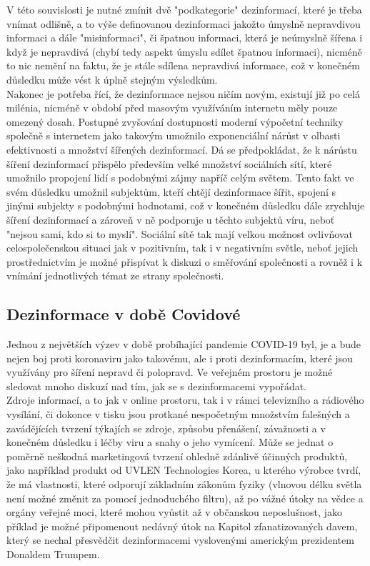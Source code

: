 V této souvislosti je nutné zmínit dvě "podkategorie" dezinformací, které je třeba vnímat odlišně, a to výše definovanou dezinformaci jakožto úmyslně nepravdivou informaci a dále "misinformaci", či špatnou informaci, která je neúmyslně šířena i když je nepravdivá (chybí tedy aspekt úmyslu sdílet špatnou informaci), nicméně to nic nemění na faktu, že je stále sdílena nepravdivá informace, což v konečném důsledku může vést k úplně stejným výsledkům\cite{lam_library_nodate}.\\

Nakonec je potřeba řící, že dezinformace nejsou ničím novým, existují již po celá milénia, nicméně v období před masovým využíváním internetu měly pouze omezený dosah. Postupné zvyšování dostupnosti moderní výpočetní techniky společně s internetem jako takovým umožnilo exponenciální nárůst v olbasti efektivnosti a množství šířených dezinformací. Dá se předpokládat, že k nárůstu šíření dezinformací přispělo především velké množství sociálních sítí, které umožnilo propojení lidí s podobnými zájmy napříč celým světem. Tento fakt ve svém důsledku umožnil subjektům, kteří chtějí dezinformace šířit, spojení s jinými subjekty s podobnými hodnotami, což v konečném důsledku dále zrychluje šíření dezinformací a zároveň v ně podporuje u těchto subjektů víru, neboť "nejsou sami, kdo si to myslí". Sociální sítě tak mají velkou možnost ovlivňovat celospolečenskou situaci jak v pozitivním, tak i v negativním světle, neboť jejich prostřednictvím je možné přispívat k diskuzi o směřování společnosti a rovněž i k vnímání jednotlivých témat ze strany společnosti.

\subsection{Dezinformace v době Covidové}

Jednou z největších výzev v době probíhající pandemie COVID-19 byl, je a bude nejen boj proti koronaviru jako takovému, ale i proti dezinformacím, které jsou využívány pro šíření nepravd či polopravd. Ve veřejném prostoru je možné sledovat mnoho diskuzí nad tím, jak se s dezinformacemi vypořádat.\\

Zdroje informací, a to jak v online prostoru, tak i v rámci televizního a rádiového vysílání, či dokonce v tisku jsou protkané nespočetným množstvím falešných a zavádějících tvrzení týkajích se zdroje, způsobu přenášení, závažnosti a v konečném důsledku i léčby viru a snahy o jeho vymícení. Může se jednat o poměrně neškodná marketingová tvrzení ohledně zdánlivě účinných produktů, jako například produkt od UVLEN \textregistered Technologies Korea\cite{uvlen__uvlen_nodate}, u kterého výrobce tvrdí, že má vlastnosti, které odporují základním zákonům fyziky (vlnovou délku světla není možné změnit za pomocí jednoduchého filtru), až po vážné útoky na vědce a orgány veřejné moci, které mohou vyůstit až v občanskou neposlušnost, jako příklad je možné připomenout nedávný útok na Kapitol zfanatizovaných davem, který se nechal přesvědčit dezinformacemi vyslovenými americkým prezidentem Donaldem Trumpem.\\

